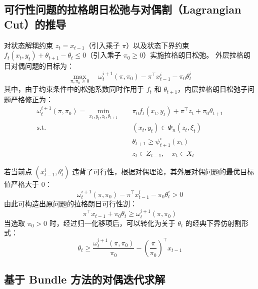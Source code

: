 \documentclass[11pt]{ctexart}
\begin{document}
\subsection{可行性问题的拉格朗日松弛与对偶割（Lagrangian Cut）的推导}
对状态解耦约束 $z_t = x_{t-1}$（引入乘子 $\pi$）以及状态下界约束 $f_t(x_t, y_t) + \theta_{t+1} - \theta_t \le 0$（引入乘子 $\pi_0 \ge 0$）实施拉格朗日松弛。
外层拉格朗日对偶问题的目标为：
\begin{equation}
\max_{\pi, \pi_0 \ge 0} \quad \omega_t^{i+1}(\pi, \pi_0) - \pi^\top x_{t-1}^i - \pi_0 \theta_t^i
\end{equation}
其中，由于约束条件中的松弛系数同时作用于 $f_t$ 和 $\theta_{t+1}$，内层拉格朗日松弛子问题严格修正为：
\begin{align}
\omega_t^{i+1}(\pi, \pi_0) = \min_{x_t, y_t, z_t, \theta_{t+1}} \quad & \pi_0 f_t(x_t, y_t) + \pi^\top z_t + \pi_0 \theta_{t+1} \\
\text{s.t.} \quad & (x_{t}, y_{t}) \in \Phi_{n}(z_{t}, \xi_{t}) \\
& \theta_{t+1} \ge \psi_{t+1}^{i}(x_{t}) \\
& z_{t} \in Z_{t-1}, \quad x_{t} \in X_{t}
\end{align}

若当前点 $(x_{t-1}^i, \theta_t^i)$ 违背了可行性，根据对偶理论，其外层对偶问题的最优目标值严格大于 0：
\begin{equation}
\omega_t^{i+1}(\pi, \pi_0) - \pi^\top x_{t-1}^i - \pi_0 \theta_t^i > 0
\end{equation}
由此可构造出原问题的拉格朗日可行性割：
\begin{equation}
\pi^\top x_{t-1} + \pi_0 \theta_t \ge \omega_t^{i+1}(\pi, \pi_0)
\end{equation}
当选取 $\pi_0 > 0$ 时，经过归一化移项后，可以转化为关于 $\theta_t$ 的经典下界仿射割形式：
\begin{equation}
\theta_t \ge \frac{\omega_t^{i+1}(\pi, \pi_0)}{\pi_0} - \left(\frac{\pi}{\pi_0}\right)^\top x_{t-1}
\end{equation}

\subsection{ 基于 Bundle 方法的对偶迭代求解}
\end{document}
